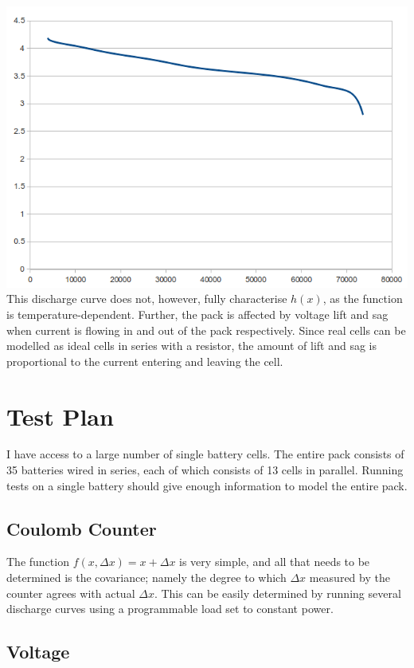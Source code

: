 \documentclass[letterpaper,12pt]{article} %
\begin{document}
\includegraphics[width=140mm]{discharge_curve.png}\\

This discharge curve does not, however, fully characterise $h(x)$, as the function is temperature-dependent. Further, the pack is affected by voltage lift and sag when current is flowing in and out of the pack respectively. Since real cells can be modelled as ideal cells in series with a resistor, the amount of lift and sag is proportional to the current entering and leaving the cell.

\section{Test Plan}

I have access to a large number of single battery cells. The entire pack consists of 35 batteries wired in series, each of which consists of 13 cells in parallel. Running tests on a single battery should give enough information to model the entire pack.\\

\subsection{Coulomb Counter}

The function $ f(x, \Delta x) = x + \Delta x $ is very simple, and all that needs to be determined is the covariance; namely the degree to which $ \Delta x $ measured by the counter agrees with actual $ \Delta x $. This can be easily determined by running several discharge curves using a programmable load set to constant power.

\subsection{Voltage}
\end{document}
